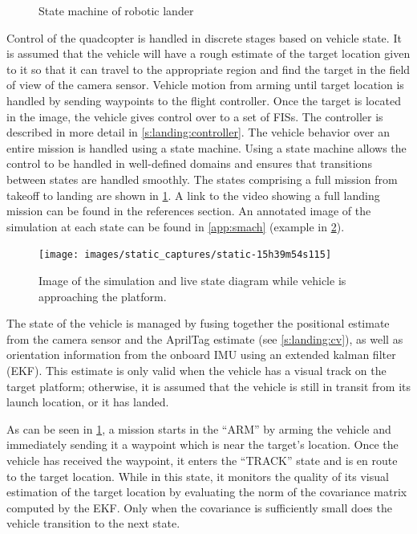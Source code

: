 \begin{figure}[H]
    \centering
    \caption{State machine of robotic lander}\label{f:smach}
\end{figure}

Control of the quadcopter is handled in discrete stages based on vehicle state. It is assumed that the vehicle
will have a rough estimate of the target location given to it so that it can travel to the appropriate region
and find the target in the field of view of the camera sensor. Vehicle motion from arming until target
location is handled by sending waypoints to the flight controller. Once the target is located in the image,
the vehicle gives control over to a set of FISs. The controller is described in more detail in
\cref{s:landing:controller}. The vehicle behavior over an entire mission is handled using a state
machine\cite{bohren2010smach}. Using a state machine allows the control to be handled in well-defined domains
and ensures that transitions between states are handled smoothly. The states comprising a full mission from
takeoff to landing are shown in \cref{f:smach}. A link to the video showing a full landing mission can be
found in the references section\cite{yt_stat}. An annotated image of the simulation at each state can be found
in \cref{app:smach} (example in \cref{f:sim_static_shot}).

\begin{figure}
    \centering
    \texttt{[image: images/static\_captures/static-15h39m54s115]}
    \caption{Image of the simulation and live state diagram while vehicle is approaching the
    platform.}\label{f:sim_static_shot}
\end{figure}

The state of the vehicle is managed by fusing together the positional estimate from the camera sensor and the
AprilTag estimate (see \cref{s:landing:cv}), as well as orientation information from the onboard IMU using an
extended kalman filter (EKF). This estimate is only valid when the vehicle has a visual track on the target
platform; otherwise, it is assumed that the vehicle is still in transit from its launch location, or it has
landed. 

As can be seen in \cref{f:smach}, a mission starts in the ``ARM'' by arming the vehicle and immediately
sending it a waypoint which is near the target's location. Once the vehicle has received the waypoint, it
enters the ``TRACK'' state and is en route to the target location. While in this state, it monitors the
quality of its visual estimation of the target location by evaluating the norm of the covariance matrix 
computed by the EKF. Only when the covariance is sufficiently small does the vehicle transition to the next
state.

